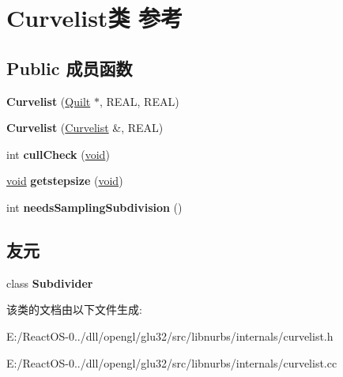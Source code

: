\hypertarget{class_curvelist}{}\section{Curvelist类 参考}
\label{class_curvelist}
\subsection*{Public 成员函数}
\begin{DoxyCompactItemize}
\item 
\mbox{\label{class_curvelist_af1879a2049fff354bb17f032a070a7ee}} 
{\bfseries Curvelist} (\hyperlink{class_quilt}{Quilt} $\ast$, R\+E\+AL, R\+E\+AL)
\item 
\mbox{\label{class_curvelist_ac6e766b4400f7583ff43c2d0cda19178}} 
{\bfseries Curvelist} (\hyperlink{class_curvelist}{Curvelist} \&, R\+E\+AL)
\item 
\mbox{\label{class_curvelist_a800af52cbd4c2a2bcaffec3688360ed6}} 
int {\bfseries cull\+Check} (\hyperlink{interfacevoid}{void})
\item 
\mbox{\label{class_curvelist_a22b2a58886e0774e7d9d3f25a62d1c8d}} 
\hyperlink{interfacevoid}{void} {\bfseries getstepsize} (\hyperlink{interfacevoid}{void})
\item 
\mbox{\label{class_curvelist_af438d0eac88346ae25a88cf3f7568cc5}} 
int {\bfseries needs\+Sampling\+Subdivision} ()
\end{DoxyCompactItemize}
\subsection*{友元}
\begin{DoxyCompactItemize}
\item 
\mbox{\label{class_curvelist_aa261a4fe48ec5e75166591417d334c67}} 
class {\bfseries Subdivider}
\end{DoxyCompactItemize}


该类的文档由以下文件生成\+:\begin{DoxyCompactItemize}
\item 
E\+:/\+React\+O\+S-\/0../dll/opengl/glu32/src/libnurbs/internals/curvelist.\+h\item 
E\+:/\+React\+O\+S-\/0../dll/opengl/glu32/src/libnurbs/internals/curvelist.\+cc\end{DoxyCompactItemize}
